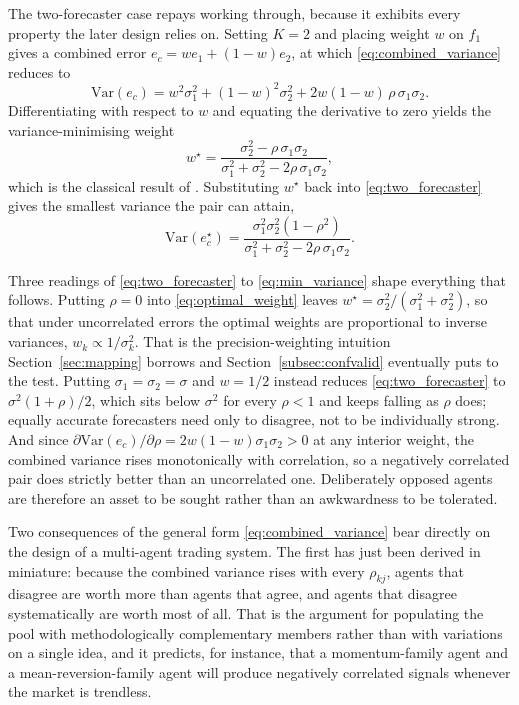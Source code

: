 The two-forecaster case repays working through, because it exhibits every property the later design relies on. Setting $K = 2$ and placing weight $w$ on $f_1$ gives a combined error $e_c = w e_1 + (1-w) e_2$, at which \eqref{eq:combined_variance} reduces to
\begin{equation}
\mathrm{Var}(e_c) = w^2 \sigma_1^2 + (1-w)^2 \sigma_2^2 + 2w(1-w)\,\rho\,\sigma_1\sigma_2 .
\label{eq:two_forecaster}
\end{equation}
Differentiating with respect to $w$ and equating the derivative to zero yields the variance-minimising weight
\begin{equation}
w^\star = \frac{\sigma_2^2 - \rho\,\sigma_1\sigma_2}{\sigma_1^2 + \sigma_2^2 - 2\rho\,\sigma_1\sigma_2},
\label{eq:optimal_weight}
\end{equation}
which is the classical result of \cite{batesgranger1969}. Substituting $w^\star$ back into \eqref{eq:two_forecaster} gives the smallest variance the pair can attain,
\begin{equation}
\mathrm{Var}(e_c^\star) = \frac{\sigma_1^2 \sigma_2^2 \left(1 - \rho^2\right)}{\sigma_1^2 + \sigma_2^2 - 2\rho\,\sigma_1\sigma_2}.
\label{eq:min_variance}
\end{equation}

Three readings of \eqref{eq:two_forecaster} to \eqref{eq:min_variance} shape everything that follows. Putting $\rho = 0$ into \eqref{eq:optimal_weight} leaves $w^\star = \sigma_2^2/(\sigma_1^2 + \sigma_2^2)$, so that under uncorrelated errors the optimal weights are proportional to inverse variances, $w_k \propto 1/\sigma_k^2$. That is the precision-weighting intuition Section~\ref{sec:mapping} borrows and Section~\ref{subsec:confvalid} eventually puts to the test. Putting $\sigma_1 = \sigma_2 = \sigma$ and $w = 1/2$ instead reduces \eqref{eq:two_forecaster} to $\sigma^2 (1 + \rho)/2$, which sits below $\sigma^2$ for every $\rho < 1$ and keeps falling as $\rho$ does; equally accurate forecasters need only to disagree, not to be individually strong. And since $\partial \mathrm{Var}(e_c) / \partial \rho = 2w(1-w)\sigma_1\sigma_2 > 0$ at any interior weight, the combined variance rises monotonically with correlation, so a negatively correlated pair does strictly better than an uncorrelated one. Deliberately opposed agents are therefore an asset to be sought rather than an awkwardness to be tolerated.

Two consequences of the general form \eqref{eq:combined_variance} bear directly on the design of a multi-agent trading system. The first has just been derived in miniature: because the combined variance rises with every $\rho_{kj}$, agents that disagree are worth more than agents that agree, and agents that disagree systematically are worth most of all. That is the argument for populating the pool with methodologically complementary members rather than with variations on a single idea, and it predicts, for instance, that a momentum-family agent and a mean-reversion-family agent will produce negatively correlated signals whenever the market is trendless.

